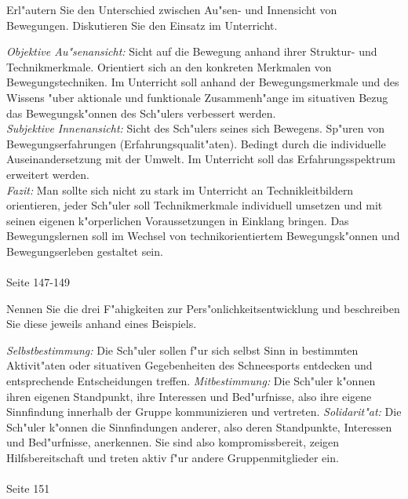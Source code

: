 \begin{question}{5}
Erl"autern Sie den Unterschied zwischen Au"sen- und Innensicht von Bewegungen. Diskutieren Sie den Einsatz im Unterricht. 
\end{question}
\begin{solution}
\emph{Objektive Au"senansicht:} Sicht auf die Bewegung anhand ihrer Struktur- und Technikmerkmale. Orientiert sich an den konkreten Merkmalen von Bewegungstechniken. Im Unterricht soll anhand der Bewegungsmerkmale und des Wissens "uber aktionale und funktionale Zusammenh"ange im situativen Bezug das Bewegungsk"onnen des Sch"ulers verbessert werden.\\
\emph{Subjektive Innenansicht:} Sicht des Sch"ulers seines sich Bewegens. Sp"uren von Bewegungserfahrungen (Erfahrungsqualit"aten). Bedingt durch die individuelle Auseinandersetzung mit der Umwelt. Im Unterricht soll das Erfahrungsspektrum erweitert werden.\\
\emph{Fazit:} Man sollte sich nicht zu stark im Unterricht an Technikleitbildern orientieren, jeder Sch"uler soll Technikmerkmale individuell umsetzen und mit seinen eigenen k"orperlichen Voraussetzungen in Einklang bringen. Das Bewegungslernen soll im Wechsel von technikorientiertem Bewegungsk"onnen und Bewegungserleben gestaltet sein.\\\\
 Seite 147-149
\end{solution}

\begin{question}{6}
Nennen Sie die drei F"ahigkeiten zur Pers"onlichkeitsentwicklung und beschreiben Sie diese jeweils anhand eines Beispiels.
\end{question}
\begin{solution}
\emph{Selbstbestimmung:} Die Sch"uler sollen f"ur sich selbst Sinn in bestimmten Aktivit"aten oder situativen Gegebenheiten des Schneesports entdecken und entsprechende Entscheidungen treffen.
\emph{Mitbestimmung:} Die Sch"uler k"onnen ihren eigenen Standpunkt, ihre Interessen und Bed"urfnisse, also ihre eigene Sinnfindung innerhalb der Gruppe kommunizieren und vertreten.
\emph{Solidarit"at:} Die Sch"uler k"onnen die Sinnfindungen anderer, also deren Standpunkte, Interessen und Bed"urfnisse, anerkennen. Sie sind also kompromissbereit, zeigen Hilfsbereitschaft und treten aktiv f"ur andere Gruppenmitglieder ein.\\\\
 Seite 151
\end{solution}

